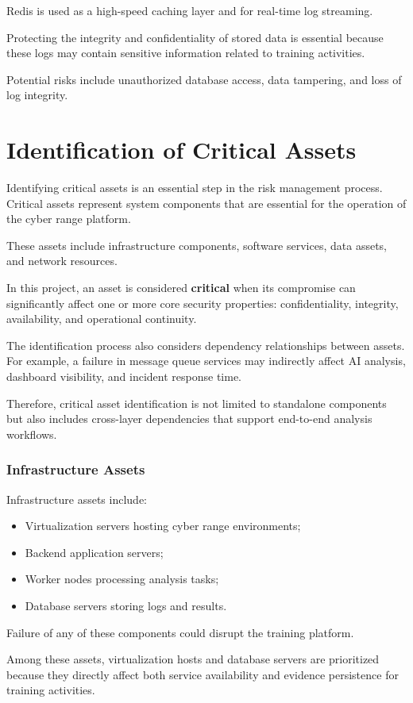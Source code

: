 Redis is used as a high-speed caching layer and for real-time log streaming.

Protecting the integrity and confidentiality of stored data is essential because these logs may contain sensitive information related to training activities.

Potential risks include unauthorized database access, data tampering, and loss of log integrity.

\section{Identification of Critical Assets}
Identifying critical assets is an essential step in the risk management process. Critical assets represent system components that are essential for the operation of the cyber range platform.

These assets include infrastructure components, software services, data assets, and network resources.

In this project, an asset is considered \textbf{critical} when its compromise can significantly affect one or more core security properties: confidentiality, integrity, availability, and operational continuity.

The identification process also considers dependency relationships between assets. For example, a failure in message queue services may indirectly affect AI analysis, dashboard visibility, and incident response time.

Therefore, critical asset identification is not limited to standalone components but also includes cross-layer dependencies that support end-to-end analysis workflows.

\subsubsection{Infrastructure Assets}
Infrastructure assets include:
\begin{itemize}
    \item Virtualization servers hosting cyber range environments;
    \item Backend application servers;
    \item Worker nodes processing analysis tasks;
    \item Database servers storing logs and results.
\end{itemize}
Failure of any of these components could disrupt the training platform.

Among these assets, virtualization hosts and database servers are prioritized because they directly affect both service availability and evidence persistence for training activities.

